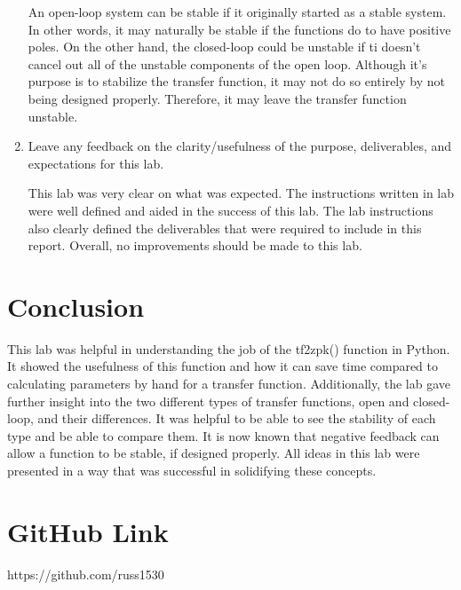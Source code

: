 \documentclass[12pt, titlepage]{article}
\begin{document}
\begin{enumerate}
        An open-loop system can be stable if it originally started as a stable system.  In other words, it may naturally be stable if the functions do to have positive poles.  On the other hand, the closed-loop could be unstable if ti doesn't cancel out all of the unstable components of the open loop.  Although it's purpose is to stabilize the transfer function, it may not do so entirely by not being designed properly.  Therefore, it may leave the transfer function unstable.
        
        \item Leave any feedback on the clarity/usefulness of the purpose, deliverables, and expectations for this lab.
        
        This lab was very clear on what was expected. The instructions written in lab were well defined and aided in the success of this lab. The lab instructions also clearly defined the deliverables that were required to include in this report. Overall, no improvements should be made to this lab.
        
    \end{enumerate}
    
    \section{Conclusion}
    This lab was helpful in understanding the job of the tf2zpk() function in Python.  It showed the usefulness of this function and how it can save time compared to calculating parameters by hand for a transfer function.  Additionally, the lab gave further insight into the two different types of transfer functions, open and closed-loop, and their differences.  It was helpful to be able to see the stability of each type and be able to compare them. It is now known that negative feedback can allow a function to be stable, if designed properly.  All ideas in this lab were presented in a way that was successful in solidifying these concepts.

    \section{GitHub Link}
        https://github.com/russ1530
\end{document}
